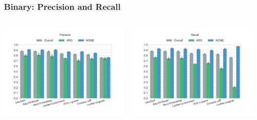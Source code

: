 \documentclass[11pt,aspectratio=169,usenames,dvipsnames]{beamer}
\begin{document}
    \begin{frame}[t]
        \frametitle{Binary: Precision and Recall}
        \begin{columns}[t]
            \column{2in}
            \centerline{\includegraphics[scale=0.31,trim={2cm 0 0 0},clip]{images/experiments/p-precision-True}}
            \column{2in}
            \centerline{\includegraphics[scale=0.31,trim={0 0 2cm 0},clip]{images/experiments/p-recall-True}}

        \end{columns}
    \end{frame}
\end{document}
